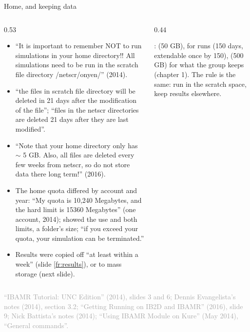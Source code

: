 \documentclass[aspectratio=169,11pt]{beamer}
\newcommand{\sourcecredit}[1]{\vfill\begin{flushright}\tiny\textcolor{DarkGray}{#1}\end{flushright}}
\begin{document}
\begin{frame}{Home,  and keeping data}
\label{fr:netscr}
\begin{columns}[T,onlytextwidth]
\begin{column}{0.53\textwidth}
\scriptsize
\begin{itemize}\setlength{\itemsep}{3pt}
  \item ``It is important to remember NOT to run simulations in your home directory!! All simulations need to be run in the scratch file directory /netscr/onyen/'' (2014).
  \item ``the files in scratch file directory will be deleted in 21 days after the modification of the file''; ``files in the netscr directories are deleted 21 days after they are last modified''.
  \item ``Note that your home directory only has $\sim$ 5 GB. Also, all files are deleted every few weeks from netscr, so do not store data there long term!'' (2016).
  \item The home quota differed by account and year: ``My quota is 10,240 Megabytes, and the hard limit is 15360 Megabytes'' (one account, 2014);  showed the use and both limits,  a folder's size; ``if you exceed your quota, your simulation can be terminated.''
  \item Results were copied off ``at least within a week'' (slide \ref{fr:results}), or to mass storage (next slide).
\end{itemize}
\end{column}
\begin{column}{0.44\textwidth}
\begin{punchbox}
\small {}:  (50 GB),  for runs (150 days, extendable once by 150),  (500 GB) for what the group keeps (chapter 1). The rule is the same: run in the scratch space, keep results elsewhere.
\end{punchbox}
\end{column}
\end{columns}
\sourcecredit{``IBAMR Tutorial: UNC Edition'' (2014), slides 3 and 6; Dennis Evangelista's notes (2014), section 3.2; ``Getting Running on IB2D and IBAMR'' (2016), slide 9; Nick Battista's notes (2014); ``Using IBAMR Module on Kure'' (May 2014), ``General commands''.}
\end{frame}
\end{document}
